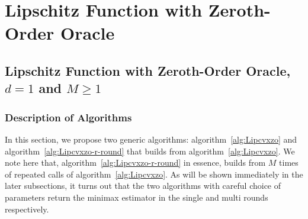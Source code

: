 %
%
%
%




\section{Lipschitz Function with Zeroth-Order Oracle}
\label{sec:proof-Lip-zo}
\subsection{Lipschitz Function with Zeroth-Order Oracle, $d = 1$ and $M \geq 1$}
\subsubsection{Description of Algorithms}
In this section, we propose two generic algorithms: algorithm~\ref{alg:Lipcvxzo}
and algorithm~\ref{alg:Lipcvxzo-r-round} that builds from algorithm~\ref{alg:Lipcvxzo}.
We note here that, algorithm~\ref{alg:Lipcvxzo-r-round} in essence, builds from 
$M$ times of repeated calls of algorithm~\ref{alg:Lipcvxzo}. As will be shown 
immediately in the later subsections, it turns out that the two algorithms with careful
choice of parameters return the minimax estimator in the single and multi rounds 
respectively. 

